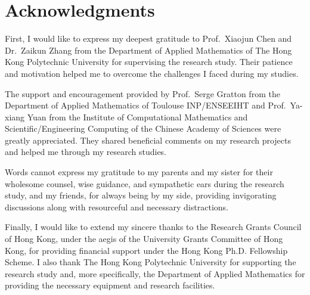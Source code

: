 %
%
%
\chapter*{Acknowledgments}
\label{ch:acknowledgments}

First, I would like to express my deepest gratitude to Prof.\ Xiaojun Chen and Dr.\ Zaikun Zhang from the Department of Applied Mathematics of The Hong Kong Polytechnic University for supervising the research study.
Their patience and motivation helped me to overcome the challenges I faced during my studies.

The support and encouragement provided by Prof.\ Serge Gratton from the Department of Applied Mathematics of Toulouse INP/ENSEEIHT and Prof.\ Ya-xiang Yuan from the Institute of Computational Mathematics and Scientific/Engineering Computing of the Chinese Academy of Sciences were greatly appreciated.
They shared beneficial comments on my research projects and helped me through my research studies.

Words cannot express my gratitude to my parents and my sister for their wholesome counsel, wise guidance, and sympathetic ears during the research study, and my friends, for always being by my side, providing invigorating discussions along with resourceful and necessary distractions.

Finally, I would like to extend my sincere thanks to the Research Grants Council of Hong Kong, under the aegis of the University Grants Committee of Hong Kong, for providing financial support under the Hong Kong Ph.D. Fellowship Scheme.
I also thank The Hong Kong Polytechnic University for supporting the research study and, more specifically, the Department of Applied Mathematics for providing the necessary equipment and research facilities.
